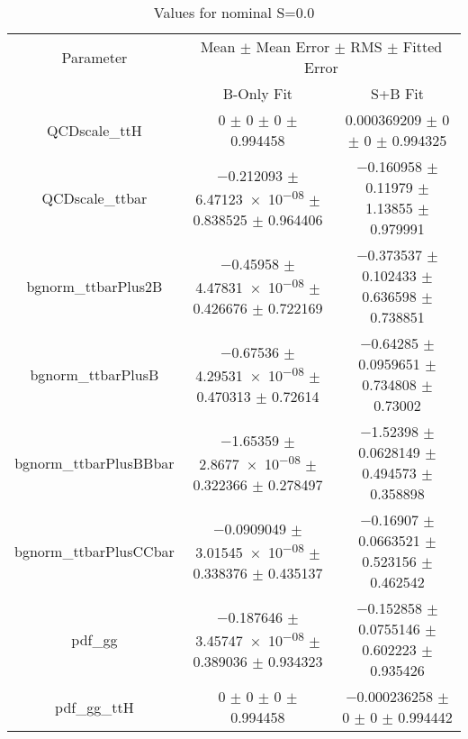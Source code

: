 \begin{table}
\centering
\caption{Values for nominal S=0.0}
\begin{tabular}{ccc}
\toprule
Parameter & \multicolumn{2}{c}{Mean $\pm$ Mean Error $\pm$ RMS $\pm$ Fitted Error}\\
 & B-Only Fit & S+B Fit\\
\midrule
QCDscale\_ttH & \num{0} $\pm$ \num{0} $\pm$ \num{0} $\pm$ \num{0.994458} & \num{0.000369209} $\pm$ \num{0} $\pm$ \num{0} $\pm$ \num{0.994325}\\
QCDscale\_ttbar & \num{-0.212093} $\pm$ \num{6.47123e-08} $\pm$ \num{0.838525} $\pm$ \num{0.964406} & \num{-0.160958} $\pm$ \num{0.11979} $\pm$ \num{1.13855} $\pm$ \num{0.979991}\\
bgnorm\_ttbarPlus2B & \num{-0.45958} $\pm$ \num{4.47831e-08} $\pm$ \num{0.426676} $\pm$ \num{0.722169} & \num{-0.373537} $\pm$ \num{0.102433} $\pm$ \num{0.636598} $\pm$ \num{0.738851}\\
bgnorm\_ttbarPlusB & \num{-0.67536} $\pm$ \num{4.29531e-08} $\pm$ \num{0.470313} $\pm$ \num{0.72614} & \num{-0.64285} $\pm$ \num{0.0959651} $\pm$ \num{0.734808} $\pm$ \num{0.73002}\\
bgnorm\_ttbarPlusBBbar & \num{-1.65359} $\pm$ \num{2.8677e-08} $\pm$ \num{0.322366} $\pm$ \num{0.278497} & \num{-1.52398} $\pm$ \num{0.0628149} $\pm$ \num{0.494573} $\pm$ \num{0.358898}\\
bgnorm\_ttbarPlusCCbar & \num{-0.0909049} $\pm$ \num{3.01545e-08} $\pm$ \num{0.338376} $\pm$ \num{0.435137} & \num{-0.16907} $\pm$ \num{0.0663521} $\pm$ \num{0.523156} $\pm$ \num{0.462542}\\
pdf\_gg & \num{-0.187646} $\pm$ \num{3.45747e-08} $\pm$ \num{0.389036} $\pm$ \num{0.934323} & \num{-0.152858} $\pm$ \num{0.0755146} $\pm$ \num{0.602223} $\pm$ \num{0.935426}\\
pdf\_gg\_ttH & \num{0} $\pm$ \num{0} $\pm$ \num{0} $\pm$ \num{0.994458} & \num{-0.000236258} $\pm$ \num{0} $\pm$ \num{0} $\pm$ \num{0.994442}\\
\bottomrule
\end{tabular}
\end{table}